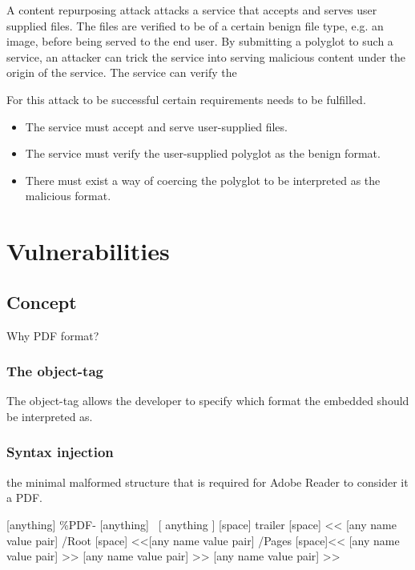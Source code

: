 \documentclass[10pt, conference, compsocconf]{IEEEtran}
\begin{document}
A content repurposing attack attacks a service that accepts and serves user supplied files. The files are verified to be of a certain benign file type, e.g. an image, before being served to the end user. By submitting a polyglot to such a service, an attacker can trick the service into serving malicious content under the origin of the service. The service can verify the

For this attack to be successful certain requirements needs to be 
fulfilled. 

\begin{itemize}
	\item The service must accept and serve user-supplied files.
	\item The service must verify the user-supplied polyglot as the benign 
				format.
	\item There must exist a way of coercing the polyglot to be 
				interpreted as the malicious format.
\end{itemize}


\section{Vulnerabilities}
\label{sec:vuln}

\subsection{Concept}


Why PDF format?

\subsubsection{The object-tag}

The object-tag allows the developer to specify which format 
the embedded should be interpreted as. 

\subsubsection{Syntax injection}

the minimal malformed structure that is required for Adobe 
Reader to consider it a PDF. 

[anything] \%PDF- [anything] \
[ anything ] [space] trailer [space] << [any name value pair] 
/Root [space] <<[any name value pair] /Pages [space]<< [any name value pair] 
>> [any name value pair] >> [any name value pair] >>
\end{document}
